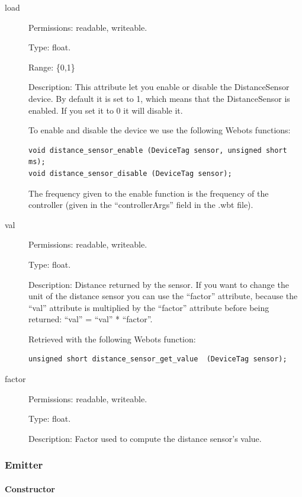 \noindent
\begin{description}
\item[{load}]     Permissions: readable, writeable.


  Type: float.


  Range: \{0,1\}


  Description: This attribute let you enable or disable the
  DistanceSensor device.  By default it is set to 1, which means that
  the DistanceSensor is enabled. If you set it to 0 it will disable
  it.


  To enable and disable the device we use the following Webots
  functions:


\begin{lstlisting}
void distance_sensor_enable (DeviceTag sensor, unsigned short ms);
void distance_sensor_disable (DeviceTag sensor);
\end{lstlisting}

The frequency given to the enable function is the frequency of the
\urbi controller (given in the ``controllerArgs'' field in the .wbt
file).

\item[{         val
 }]            Permissions: readable, writeable.


 Type: float.


 Description: Distance returned by the sensor. If you want to change
 the unit of the distance sensor you can use the ``factor'' attribute,
 because the ``val'' attribute is multiplied by the ``factor'' attribute
 before being returned: ``val'' = ``val'' * ``factor''.


 Retrieved with the following Webots function:


\begin{lstlisting}
unsigned short distance_sensor_get_value  (DeviceTag sensor);
\end{lstlisting}
\item[{factor}] Permissions: readable, writeable.


  Type: float.


  Description: Factor used to compute the distance sensor's value.

\end{description}

\subsubsection{Emitter}
\label{webots.uobjects.robotdevices.emitter}%

\paragraph{Constructor}
\label{webots.uobjects.robotdevices.emitter.constructor}%

